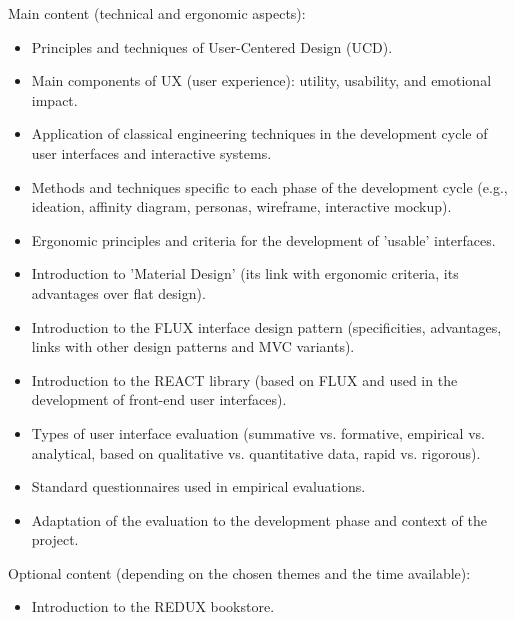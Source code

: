 Main content (technical and ergonomic aspects):
\begin{itemize}
    \item Principles and techniques of User-Centered Design (UCD).
    \item Main components of UX (user experience): utility, usability, and emotional impact.
    \item Application of classical engineering techniques in the development cycle of user interfaces and interactive systems.
    \item Methods and techniques specific to each phase of the development cycle (e.g., ideation, affinity diagram, personas, wireframe, interactive mockup).
    \item Ergonomic principles and criteria for the development of 'usable' interfaces.
    \item Introduction to 'Material Design' (its link with ergonomic criteria, its advantages over flat design).
    \item Introduction to the FLUX interface design pattern (specificities, advantages, links with other design patterns and MVC variants).
    \item Introduction to the REACT library (based on FLUX and used in the development of front-end user interfaces).
    \item Types of user interface evaluation (summative vs. formative, empirical vs. analytical, based on qualitative vs. quantitative data, rapid vs. rigorous).
    \item Standard questionnaires used in empirical evaluations.
    \item Adaptation of the evaluation to the development phase and context of the project.
\end{itemize}
Optional content (depending on the chosen themes and the time available):
\begin{itemize}
    \item Introduction to the REDUX bookstore.
\end{itemize}